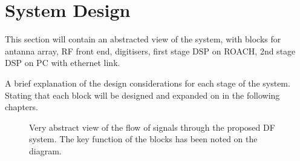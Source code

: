 \chapter{System Design}
\label{ch:system-design}
\graphicspath{{./img/system-design/}}

This section will contain an abstracted view of the system, with blocks for antanna array, RF front end, digitisers, first stage DSP on ROACH, 2nd stage DSP on PC with ethernet link.

A brief explanation of the design considerations for each stage of the system. Stating that each block will be designed and expanded on in the following chapters.

\begin{landscape}
  \thispagestyle{empty}
  \begin{figure}
    \centering
  \caption{Very abstract view of the flow of signals through the proposed DF system. The key function of the blocks has been noted on the diagram. }
  \end{figure}
\end{landscape}
